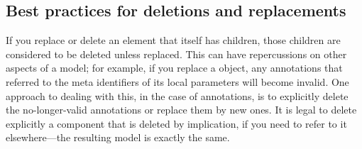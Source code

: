 \subsection{Best practices for deletions and replacements}
\label{best-practices-deletions}
\label{best-practices-replacements}

If you replace or delete an element that itself has children, those
children are considered to be deleted unless replaced.  This can have
repercussions on other aspects of a model; for example, if you replace a
\KineticLaw object, any annotations that referred to the meta
identifiers of its local parameters will become invalid.  One approach
to dealing with this, in the case of annotations, is to explicitly
delete the no-longer-valid annotations or replace them by new ones.  It
is legal to delete explicitly a component that is deleted by
implication, if you need to refer to it elsewhere---the resulting model
is exactly the same.





